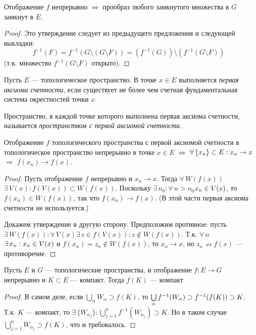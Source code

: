\documentclass[12pt,titlepage, a4paper]{article}
\begin{document}
\begin{predl}\label{predl.zamk->zamk}
Отображение $f$ непрерывно $\Leftrightarrow$ прообраз любого
замкнутого множества в $G$ замкнут в $E$.
\end{predl}

\begin{proof}
Это утверждение следует из предыдущего предложения и следующей
выкладки: $$f^{-1}(F)=f^{-1}(G\setminus (G\setminus F))=(f^{-1}(G))
\setminus(f^{-1}(G\setminus F))$$ (т.к. множество $f^{-1}(G\setminus
F)$ открыто).
\end{proof}

\begin{defen}
Пусть $E$ --- топологическое пространство. В точке $x\in E$
выполняется \emph{первая аксиома счетности}, если существует не
более чем счетная фундаментальная система окрестностей точки $x$.

Пространство, в каждой точке которого выполнена первая аксиома
счетности, называется \emph{пространством с первой аксиомой
счетности}.
\end{defen}

\begin{theorem}
Отображение $f$ топологического пространства с первой аксиомой
счетности в топологическое пространство непрерывно в точке $x\in E$
$\Leftrightarrow$ $\forall\,\{x_n\}\p\subset E:x_n\to x$
$\Rightarrow$ $f(x_n)\to f(x)$.
\end{theorem}

\begin{proof}
Пусть отображение $f$ непрерывно и $x_n\to x$. Тогда
$\forall\,W(f(x))$\;\;$\exists\, V(x):f(V(x))\subset W(f(x))$.
Поскольку $\exists\,n_0:\forall\,n>n_0$\;\;$x_n\p\in V(x)$, то
$f(x_n)\in W(f(x))$, так что $f(x_n)\to f(x)$. (В этой части первая
аксиома счетности не используется.)

Докажем утверждение в другую сторону. Предположим противное: пусть
$\exists\, W(f(x)):\forall\,V(x)$\;\;$\exists\,z\in f(V(x)):z\not\in
W(f(x))$. Т.к. $\forall\,n$\;\;$\exists\,x_n:x_n\p\in V(x)$ и
$f(x_n)=z_n\not\in W(f(x))$, то $x_n\to x$, но $z_n\nrightarrow
f(x)$ --- противоречие.
\end{proof}

\begin{predl}
Пусть $E$ и $G$ --- топологические пространства, и отображение
$f\colon E\to G$ непрерывно и $K\subset E$ --- компакт. Тогда $f(K)$
--- компакт
\end{predl}

\begin{proof}
В самом деле, если $\bigcup\limits_\alpha W_\alpha\supset f(K)$, то
$\bigcup\limits_{\alpha}f^{-1}(W_\alpha)\p\supset
f^{-1}(f(K))\supset K$. Т.к. $K$ --- компакт, то
$\exists\,\{W_{\alpha_j}\}:\bigcup\limits_{j=1}^n
f^{-1}(W_{\alpha_j})\supset K$. Но в таком случае
$\bigcup\limits_{j=1}^n W_{\alpha_j}\supset f(K)$, что и
требовалось.
\end{proof}
\end{document}
